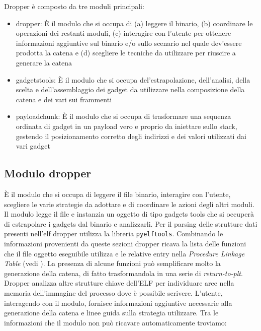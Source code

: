 Dropper è composto da tre moduli principali:

\begin{itemize}

  \item dropper: È il modulo che si occupa di (a) leggere il binario,
    (b) coordinare le operazioni dei restanti moduli, (c) interagire
    con l'utente per ottenere informazioni aggiuntive sul binario e/o
    sullo scenario nel quale dev'essere prodotta la catena e (d)
    scegliere le tecniche da utilizzare per riuscire a generare la
    catena

  \item gadgetstools: È il modulo che si occupa del'estrapolazione,
    dell'analisi, della scelta e dell'assemblaggio dei gadget da utilizzare nella
    composizione della catena e dei vari sui frammenti

  \item payloadchunk: È il modulo che si occupa di trasformare una
    sequenza ordinata di gadget in un payload vero e proprio da
    iniettare sullo stack, gestendo il posizionamento corretto degli
    indirizzi e dei valori utilizzati dai vari gadget

\end{itemize}

\subsection{Modulo dropper}

È il modulo che si occupa di leggere il file binario, interagire con
l'utente, scegliere le varie strategie da adottare e di coordinare le
azioni degli altri moduli. Il modulo legge il file e instanzia un
oggetto di tipo gadgets tools che si occuperà di estrapolare i gadgets
dal binario e analizzarli. Per il parsing delle strutture dati
presenti nell'elf dropper utilizza la libreria
\lstinline{pyelftools}\cite{pyelftools}. Combinando le informazioni
provenienti da queste sezioni dropper ricava la lista delle funzioni
che il file oggetto eseguibile utilizza e le relative entry nella
\emph{Procedure Linkage Table} (vedi \rif{}). La presenza di alcune
funzioni può semplificare molto la generazione della catena, di fatto
trasformandola in una serie di \emph{return-to-plt}. Dropper analizza
altre strutture chiave dell'ELF per individuare aree nella memoria
dell'immagine del processo dove è possibile scrivere. L'utente,
interagendo con il modulo, fornisce informazioni aggiuntive necessarie
alla generazione della catena e linee guida sulla strategia
utilizzare. Tra le informazioni che il modulo non può ricavare
automaticamente troviamo:

